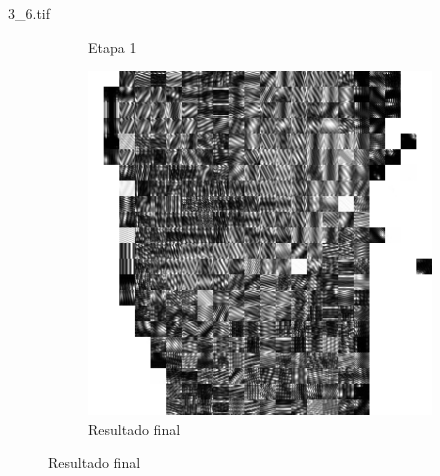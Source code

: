 \documentclass{beamer}
\begin{document}
\begin{frame}{3\_6.tif}
\begin{figure}
\begin{subfigure}[!ht]{0.32\textwidth}
                \caption{Etapa 1}
            \end{subfigure}
            \begin{subfigure}[!ht]{0.32\textwidth}
                \includegraphics[width=\columnwidth]{Fingerprints/3_6_final.jpg}
                \caption{Resultado final}
            \end{subfigure}
        \end{figure}
    \end{frame}
\end{document}
